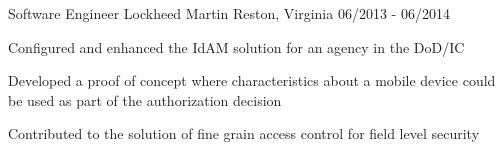 \begin{cventries}
  \cventry
    {Software Engineer} %
    {Lockheed Martin} %
    {Reston, Virginia} %
    {06/2013 - 06/2014} %
    {
      \begin{cvitems} %
        \item {Configured and enhanced the IdAM solution for an agency in the DoD/IC}
        \item {Developed a proof of concept where characteristics about a mobile device could be used as part of the authorization decision}
        \item {Contributed to the solution of fine grain access control for field level security}
      \end{cvitems}
    }

\end{cventries}
